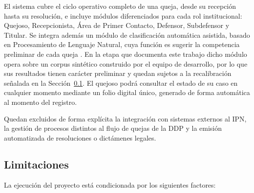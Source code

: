	El sistema cubre el ciclo operativo completo de una queja, desde su recepción hasta su resolución, e
	incluye módulos diferenciados para cada rol institucional: Quejoso, Recepcionista, Área de Primer
	Contacto, Defensor, Subdefensor y Titular. Se integra además un módulo de clasificación automática
	asistida, basado en Procesamiento de Lenguaje Natural, cuya función es sugerir la competencia
	preliminar de cada queja \cite{reimers2019sbert}. En la etapa que documenta este trabajo dicho
	módulo opera sobre un corpus sintético construido por el equipo de desarrollo, por lo que sus
	resultados tienen carácter preliminar y quedan sujetos a la recalibración señalada en la
	Sección~\ref{sec:limitaciones}. El quejoso podrá consultar el estado de su caso en cualquier
	momento mediante un folio digital único, generado de forma automática al momento del registro.
	
	Quedan excluidos de forma explícita la integración con sistemas externos al IPN, la gestión de
	procesos distintos al flujo de quejas de la DDP y la emisión automatizada de resoluciones o
	dictámenes legales.
	
	\subsection{Limitaciones}
	\label{sec:limitaciones}
	La ejecución del proyecto está condicionada por los siguientes factores:
	
